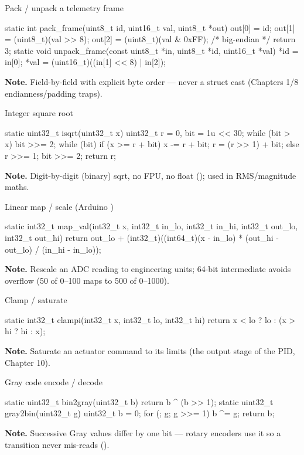 \begin{gymproblem}{Pack / unpack a telemetry frame}
\begin{cgym}
static int pack_frame(uint8_t id, uint16_t val, uint8_t *out) {
    out[0] = id; out[1] = (uint8_t)(val >> 8); out[2] = (uint8_t)(val & 0xFF);   /* big-endian */
    return 3;
}
static void unpack_frame(const uint8_t *in, uint8_t *id, uint16_t *val) {
    *id = in[0]; *val = (uint16_t)((in[1] << 8) | in[2]);
}
\end{cgym}
\textbf{Note.} Field-by-field with explicit byte order --- never a struct cast
(Chapters 1/8 endianness/padding traps).
\end{gymproblem}

\begin{gymproblem}{Integer square root}
\begin{cgym}
static uint32_t isqrt(uint32_t x) {
    uint32_t r = 0, bit = 1u << 30;
    while (bit > x) bit >>= 2;
    while (bit) { if (x >= r + bit) { x -= r + bit; r = (r >> 1) + bit; } else r >>= 1; bit >>= 2; }
    return r;
}
\end{cgym}
\textbf{Note.} Digit-by-digit (binary) sqrt, no FPU, no float
(); used in RMS/magnitude maths.
\end{gymproblem}

\begin{gymproblem}{Linear map / scale (Arduino )}
\begin{cgym}
static int32_t map_val(int32_t x, int32_t in_lo, int32_t in_hi,
                       int32_t out_lo, int32_t out_hi) {
    return out_lo +
        (int32_t)((int64_t)(x - in_lo) * (out_hi - out_lo) / (in_hi - in_lo));
}
\end{cgym}
\textbf{Note.} Rescale an ADC reading to engineering units; 64-bit intermediate
avoids overflow (50 of 0--100 maps to 500 of 0--1000).
\end{gymproblem}

\begin{gymproblem}{Clamp / saturate}
\begin{cgym}
static int32_t clampi(int32_t x, int32_t lo, int32_t hi) { return x < lo ? lo : (x > hi ? hi : x); }
\end{cgym}
\textbf{Note.} Saturate an actuator command to its limits (the output stage of
the PID, Chapter 10).
\end{gymproblem}

\begin{gymproblem}{Gray code encode / decode}
\begin{cgym}
static uint32_t bin2gray(uint32_t b) { return b ^ (b >> 1); }
static uint32_t gray2bin(uint32_t g) { uint32_t b = 0; for (; g; g >>= 1) b ^= g; return b; }
\end{cgym}
\textbf{Note.} Successive Gray values differ by one bit --- rotary encoders use it
so a transition never mis-reads ().
\end{gymproblem}

